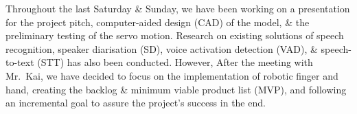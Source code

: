 
Throughout the last Saturday \& Sunday, we have been working on a presentation for the project pitch, computer-aided design (CAD) of the model, \& the preliminary testing of the servo motion. Research on existing solutions of speech recognition, speaker diarisation (SD), voice activation detection (VAD), \& speech-to-text (STT) has also been conducted. However, After the meeting with Mr.~Kai, we have decided to focus on the implementation of robotic finger and hand, creating the backlog \& minimum viable product list (MVP), and following an incremental goal to assure the project's success in the end.

\newpage